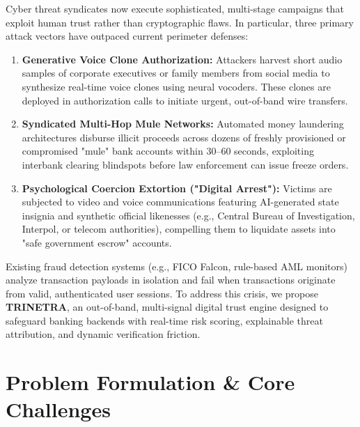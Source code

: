 \documentclass[10pt,journal,compsoc]{IEEEtran}
\begin{document}
Cyber threat syndicates now execute sophisticated, multi-stage campaigns that exploit human trust rather than cryptographic flaws. In particular, three primary attack vectors have outpaced current perimeter defenses:
\begin{enumerate}
    \item \textbf{Generative Voice Clone Authorization:} Attackers harvest short audio samples of corporate executives or family members from social media to synthesize real-time voice clones using neural vocoders. These clones are deployed in authorization calls to initiate urgent, out-of-band wire transfers.
    \item \textbf{Syndicated Multi-Hop Mule Networks:} Automated money laundering architectures disburse illicit proceeds across dozens of freshly provisioned or compromised "mule" bank accounts within 30--60 seconds, exploiting interbank clearing blindspots before law enforcement can issue freeze orders.
    \item \textbf{Psychological Coercion Extortion ("Digital Arrest"):} Victims are subjected to video and voice communications featuring AI-generated state insignia and synthetic official likenesses (e.g., Central Bureau of Investigation, Interpol, or telecom authorities), compelling them to liquidate assets into "safe government escrow" accounts.
\end{enumerate}

Existing fraud detection systems (e.g., FICO Falcon, rule-based AML monitors) analyze transaction payloads in isolation and fail when transactions originate from valid, authenticated user sessions. To address this crisis, we propose \textbf{TRINETRA}, an out-of-band, multi-signal digital trust engine designed to safeguard banking backends with real-time risk scoring, explainable threat attribution, and dynamic verification friction.

\section{Problem Formulation \& Core Challenges}
\label{sec:problem}
\end{document}
